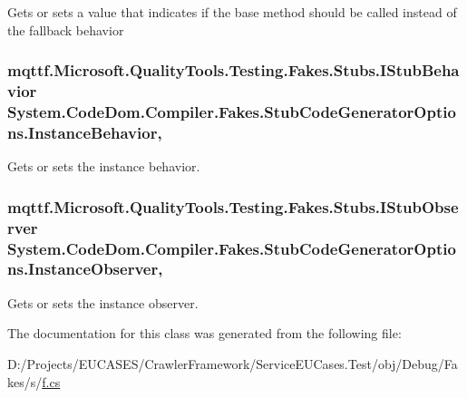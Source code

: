 Gets or sets a value that indicates if the base method should be called instead of the fallback behavior

\hypertarget{class_system_1_1_code_dom_1_1_compiler_1_1_fakes_1_1_stub_code_generator_options_a0c1a61320fbf4cb8d6f403a722808de3}{
\subsubsection[{Instance\-Behavior}]{\setlength{\rightskip}{0pt plus 5cm}mqttf.\-Microsoft.\-Quality\-Tools.\-Testing.\-Fakes.\-Stubs.\-I\-Stub\-Behavior System.\-Code\-Dom.\-Compiler.\-Fakes.\-Stub\-Code\-Generator\-Options.\-Instance\-Behavior\hspace{0.3cm}{\ttfamily [get]}, {\ttfamily [set]}}}\label{class_system_1_1_code_dom_1_1_compiler_1_1_fakes_1_1_stub_code_generator_options_a0c1a61320fbf4cb8d6f403a722808de3}


Gets or sets the instance behavior.

\hypertarget{class_system_1_1_code_dom_1_1_compiler_1_1_fakes_1_1_stub_code_generator_options_a3636c4fd0f976f2a78ba8eb359e9c88d}{
\subsubsection[{Instance\-Observer}]{\setlength{\rightskip}{0pt plus 5cm}mqttf.\-Microsoft.\-Quality\-Tools.\-Testing.\-Fakes.\-Stubs.\-I\-Stub\-Observer System.\-Code\-Dom.\-Compiler.\-Fakes.\-Stub\-Code\-Generator\-Options.\-Instance\-Observer\hspace{0.3cm}{\ttfamily [get]}, {\ttfamily [set]}}}\label{class_system_1_1_code_dom_1_1_compiler_1_1_fakes_1_1_stub_code_generator_options_a3636c4fd0f976f2a78ba8eb359e9c88d}


Gets or sets the instance observer.



The documentation for this class was generated from the following file\-:\begin{DoxyCompactItemize}
\item 
D\-:/\-Projects/\-E\-U\-C\-A\-S\-E\-S/\-Crawler\-Framework/\-Service\-E\-U\-Cases.\-Test/obj/\-Debug/\-Fakes/s/\hyperlink{s_2f_8cs}{f.\-cs}\end{DoxyCompactItemize}
